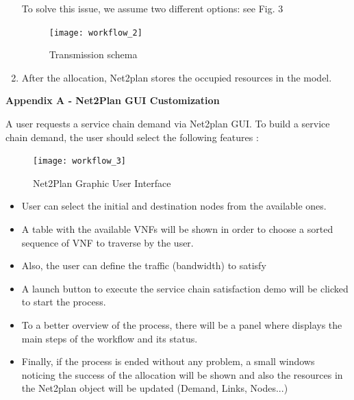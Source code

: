 \documentclass[]{scrartcl}
\begin{document}
\begin{enumerate}
		To solve this issue, we assume two different options: see Fig. 3
	
		\begin{figure}[h!]
			\centering
			\label{fig:workflow_2}
			\texttt{[image: workflow\_2]}
			\caption{Transmission schema}
		\end{figure}
	
		\item After the allocation, Net2plan stores the occupied resources in the model. 
	\end{enumerate}

\newpage

\appendix

\large{\textbf{Appendix A - Net2Plan GUI Customization}}

 A user requests a service chain demand via Net2plan GUI. To build a service chain demand, the user should select the following features :
 
 \begin{figure}[h!]
 	\centering
 	\label{fig:workflow_3}
 	\texttt{[image: workflow\_3]}
 	\caption{Net2Plan Graphic User Interface}
 \end{figure}
 
 
\begin{itemize}
	\item User can select the initial and destination nodes from the available ones. 
	\item A table with the available VNFs will be shown in order to choose a sorted sequence of VNF to traverse by the user. 
	\item Also, the user can define the traffic (bandwidth) to satisfy
	\item A launch button to execute the service chain satisfaction demo will be clicked to start the process.
	\item To a better overview of the process, there will be a panel where displays the main steps of the workflow and its status.
	\item Finally, if the process is ended without any problem, a small windows noticing the success of the allocation will be shown and also the resources in the Net2plan object will be updated (Demand, Links, Nodes...)
\end{itemize} 
\end{document}
